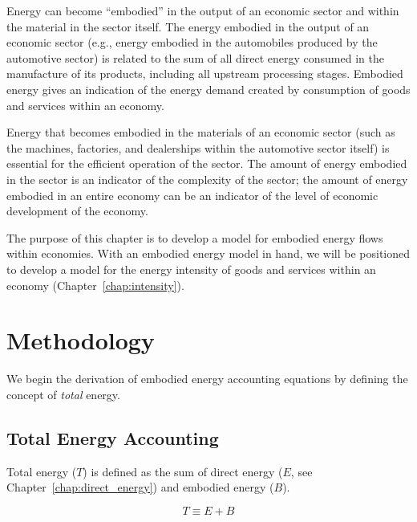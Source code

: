 Energy can become ``embodied'' in the output of an economic sector
and within the material in the sector itself.
The energy embodied in the output of an economic sector 
(e.g., energy embodied in the automobiles produced by the automotive sector)
is related to the sum of all direct energy
consumed in the manufacture of its products, 
including all upstream processing stages. 
Embodied energy gives an indication 
of the energy demand created by consumption of goods and services
within an economy.

Energy that becomes embodied in the materials of an economic sector 
(such as the machines, factories, and dealerships 
within the automotive sector itself) is essential for 
the efficient operation of the sector. The amount of energy
embodied in the sector is an indicator of the complexity of
the sector; the amount of energy embodied in an entire economy
can be an indicator of the level of 
economic development
of the economy.

The purpose of this chapter is to develop a model for 
embodied energy flows within economies. 
With an embodied energy model in hand, we will be positioned
to develop a model for the energy intensity 
of goods and services within an economy 
(Chapter~\ref{chap:intensity}).


\section{Methodology}
\label{sec:embodied_methodology}

We begin the derivation of embodied energy accounting
equations by defining the concept of 
\emph{total} energy. 


\subsection{Total Energy Accounting}
\label{sec:total_energy_accounting}

Total energy ($T$) is defined as the sum of 
direct energy 
($E$, see Chapter~\ref{chap:direct_energy}) 
and embodied energy ($B$).

\begin{equation} \label{eq:T_def}
	T \equiv E + B
\end{equation}

